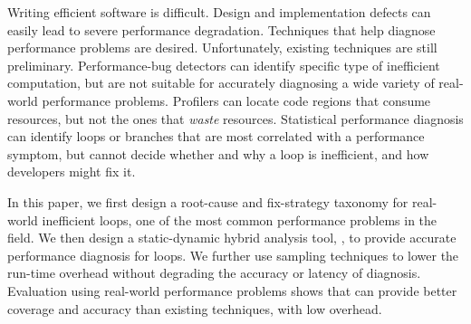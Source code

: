 Writing efficient software is difficult.
Design and implementation defects can easily
lead to severe performance 
degradation. Techniques that help
diagnose performance problems are desired.
Unfortunately, existing techniques are still preliminary.
Performance-bug detectors can identify specific type
of inefficient computation, but are not suitable for accurately diagnosing
a wide variety of real-world performance problems. 
Profilers can locate code regions that consume resources, but 
not the ones that \textit{waste} resources.
Statistical performance diagnosis can
identify loops or branches that are most correlated with a performance
symptom, but cannot decide whether and why a loop is inefficient, and
how developers might fix it.

In this paper, we first design a root-cause
and fix-strategy taxonomy for real-world inefficient loops, 
one of the most common performance problems in the field.
We then design a static-dynamic hybrid analysis tool, \Tool, to
provide accurate performance diagnosis for loops.
We further use sampling techniques to lower the run-time overhead without
degrading the accuracy or latency of \Tool diagnosis. 
Evaluation using real-world performance
problems shows that \Tool can provide better coverage and accuracy than
existing techniques, with low overhead.
